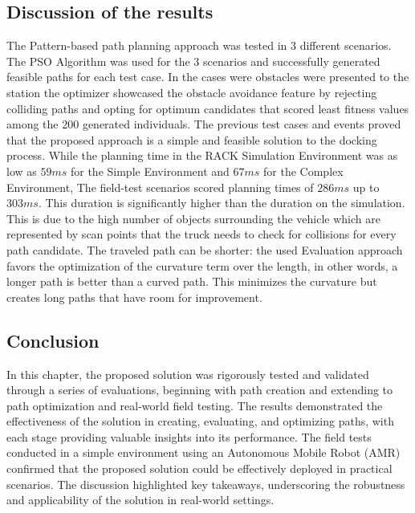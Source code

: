 \subsection{Discussion of the results}

The Pattern-based path planning approach was tested in 3 different scenarios.
The PSO Algorithm was used for the 3 scenarios and successfully generated feasible paths for each 
test case. In the cases were obstacles were presented to the station the optimizer 
showcased the obstacle avoidance feature by rejecting colliding paths and opting for optimum
candidates that scored least fitness values among the 200 generated individuals.
The previous test cases and events proved that the proposed approach is a simple and feasible 
solution to the docking process.
While the planning time in the RACK Simulation Environment was as low as \(59ms\) for the Simple Environment
and \(67ms\) for the Complex Environment, The field-test scenarios scored planning times of 
\(286ms\) up to \(303ms\). 
This duration is significantly higher than the duration 
on the simulation. This is due to the high number of objects surrounding the vehicle which are 
represented by scan points that the truck needs to check for collisions for every path candidate.  
The traveled path can be shorter: the used Evaluation approach favors the optimization of the 
curvature term over the length, in other words, a longer path is better than a curved path.
This minimizes the curvature but creates long paths that have room for improvement. 

\subsection*{Conclusion}
In this chapter, the proposed solution was rigorously tested and validated through a series of evaluations, 
beginning with path creation and extending to path optimization and real-world field testing. 
The results demonstrated the effectiveness of the solution in creating, evaluating, and optimizing paths, 
with each stage providing valuable insights into its performance. The field tests conducted in a simple 
environment using an Autonomous Mobile Robot (AMR) confirmed that the proposed solution could be effectively 
deployed in practical scenarios. The discussion highlighted key takeaways, underscoring the robustness 
and applicability of the solution in real-world settings.